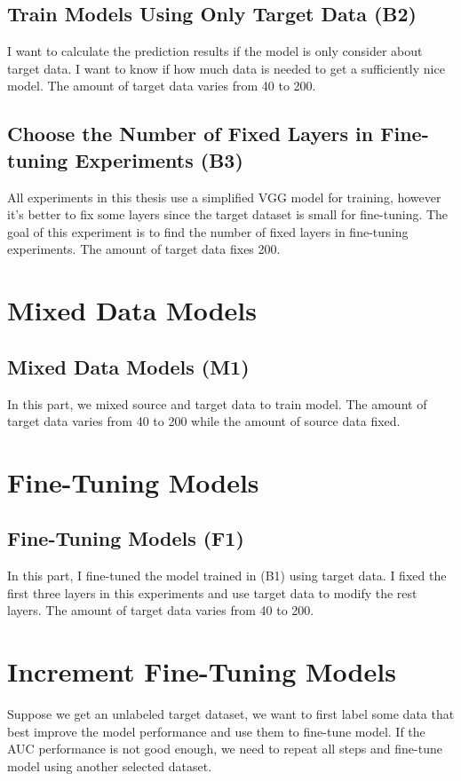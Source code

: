 \subsection{Train Models Using Only Target Data (B2)}
I want to calculate the prediction results if the model is only consider about target data. I want to know if how much data is needed to get a sufficiently nice model. The amount of target data varies from 40 to 200.
\subsection{Choose the Number of Fixed Layers in Fine-tuning Experiments (B3)}
All experiments in this thesis use a simplified VGG model for training, however it's better to fix some layers since the target dataset is small for fine-tuning. The goal of this experiment is to find the number of fixed layers in fine-tuning experiments. The amount of target data fixes 200.
~\\
\section{Mixed Data Models}
\subsection{Mixed Data Models (M1)}
In this part, we mixed source and target data to train model. The amount of target data varies from 40 to 200 while the amount of source data fixed.
~\\
\section{Fine-Tuning Models}
\subsection{Fine-Tuning Models (F1)}
In this part, I fine-tuned the model trained in (B1) using target data. I fixed the first three layers in this experiments and use target data to modify the rest layers. The amount of target data varies from 40 to 200.
~\\
\section{Increment Fine-Tuning Models}
Suppose we get an unlabeled target dataset, we want to first label some data that best improve the model performance and use them to fine-tune model. If the AUC performance is not good enough, we need to repeat all steps and fine-tune model using another selected dataset.

